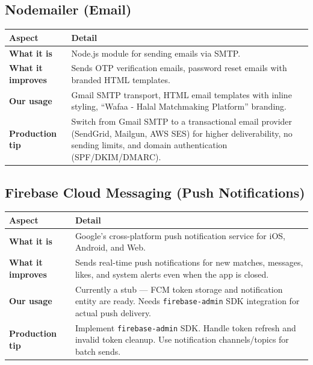 \documentclass[a4paper,11pt]{article}
\begin{document}
\subsection{Nodemailer (Email)}

\begin{longtable}{L{3.5cm} L{11.5cm}}
\toprule
\textbf{Aspect} & \textbf{Detail} \\
\midrule
\endhead
\textbf{What it is} & Node.js module for sending emails via SMTP. \\
\midrule
\textbf{What it improves} & Sends OTP verification emails, password reset emails with branded HTML templates. \\
\midrule
\textbf{Our usage} & Gmail SMTP transport, HTML email templates with inline styling, ``Wafaa - Halal Matchmaking Platform'' branding. \\
\midrule
\textbf{Production tip} & Switch from Gmail SMTP to a transactional email provider (SendGrid, Mailgun, AWS SES) for higher deliverability, no sending limits, and domain authentication (SPF/DKIM/DMARC). \\
\bottomrule
\end{longtable}

\subsection{Firebase Cloud Messaging (Push Notifications)}

\begin{longtable}{L{3.5cm} L{11.5cm}}
\toprule
\textbf{Aspect} & \textbf{Detail} \\
\midrule
\endhead
\textbf{What it is} & Google's cross-platform push notification service for iOS, Android, and Web. \\
\midrule
\textbf{What it improves} & Sends real-time push notifications for new matches, messages, likes, and system alerts even when the app is closed. \\
\midrule
\textbf{Our usage} & Currently a stub --- FCM token storage and notification entity are ready. Needs \texttt{firebase-admin} SDK integration for actual push delivery. \\
\midrule
\textbf{Production tip} & Implement \texttt{firebase-admin} SDK. Handle token refresh and invalid token cleanup. Use notification channels/topics for batch sends. \\
\bottomrule
\end{longtable}
\end{document}
